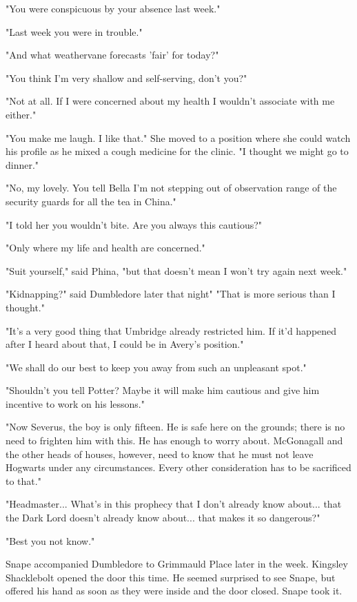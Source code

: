 \documentclass[a4paper,11pt]{article}
\begin{document}
"You were conspicuous by your absence last week."

"Last week you were in trouble."

"And what weathervane forecasts 'fair' for today?"

"You think I'm very shallow and self-serving, don't you?"

"Not at all. If I were concerned about my health I wouldn't associate with me either."

"You make me laugh. I like that." She moved to a position where she could watch his profile as he mixed a cough medicine for the clinic. "I thought we might go to dinner."

"No, my lovely. You tell Bella I'm not stepping out of observation range of the security guards for all the tea in China."

"I told her you wouldn't bite. Are you always this cautious?"

"Only where my life and health are concerned."

"Suit yourself," said Phina, "but that doesn't mean I won't try again next week."

"Kidnapping?" said Dumbledore later that night" "That is more serious than I thought."

"It's a very good thing that Umbridge already restricted him. If it'd happened after I heard about that, I could be in Avery's position."

"We shall do our best to keep you away from such an unpleasant spot."

"Shouldn't you tell Potter? Maybe it will make him cautious and give him incentive to work on his lessons."

"Now Severus, the boy is only fifteen. He is safe here on the grounds; there is no need to frighten him with this. He has enough to worry about. McGonagall and the other heads of houses, however, need to know that he must not leave Hogwarts under any circumstances. Every other consideration has to be sacrificed to that."

"Headmaster... What's in this prophecy that I don't already know about... that the Dark Lord doesn't already know about... that makes it so dangerous?"

"Best you not know."

Snape accompanied Dumbledore to Grimmauld Place later in the week. Kingsley Shacklebolt opened the door this time. He seemed surprised to see Snape, but offered his hand as soon as they were inside and the door closed. Snape took it.
\end{document}

